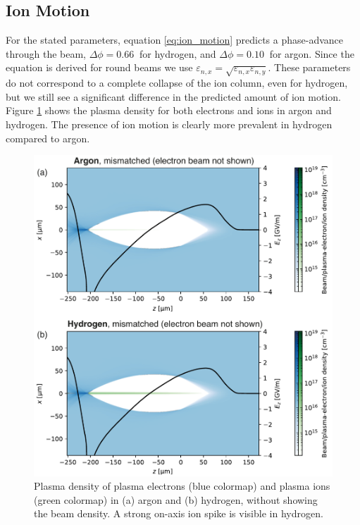 \documentclass[a4paper,
               biblatex,     %
               ]{jacow}
\begin{document}
\subsection{Ion Motion}
For the stated parameters, equation \ref{eq:ion_motion} predicts a phase-advance through the beam, $\Delta\phi=\SI{0.66}{}$ for hydrogen, and $\Delta\phi=\SI{0.10}{}$ for argon. Since the equation is derived for round beams we use $\varepsilon_{n,x}=\sqrt{\varepsilon_{n,x}\varepsilon_{n,y}}$. These parameters do not correspond to a complete collapse of the ion column, even for hydrogen, but we still see a significant difference in the predicted amount of ion motion. Figure \ref{fig:density} shows the plasma density for both electrons and ions in argon and hydrogen. The presence of ion motion is clearly more prevalent in hydrogen compared to argon.
\begin{figure}[!tbh]
    \centering
    \includegraphics[width=0.9\linewidth]{TUPS013_f1.pdf}
    \caption{Plasma density of plasma electrons (blue colormap) and plasma ions (green colormap) in (a) argon and (b) hydrogen, without showing the beam density. A strong on-axis ion spike is visible in hydrogen.}
    \label{fig:density}
\end{figure}
\end{document}
